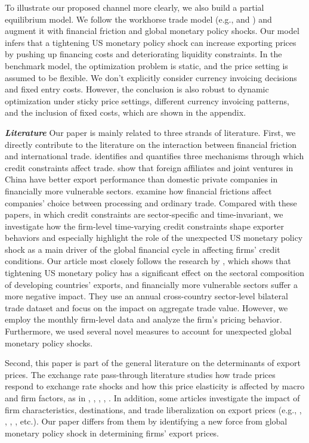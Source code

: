 To illustrate our proposed channel more clearly, we also build a partial equilibrium model. We follow the workhorse trade model (e.g., \cite{melitz2003impact} and \cite{manova2013credit}) and augment it with financial friction and global monetary policy shocks. Our model infers that a tightening US monetary policy shock can increase exporting prices by pushing up financing costs and deteriorating liquidity constraints. In the benchmark model, the optimization problem is static, and the price setting is assumed to be flexible. We don't explicitly consider currency invoicing decisions and fixed entry costs. However, the conclusion is also robust to dynamic optimization under sticky price settings, different currency invoicing patterns, and the inclusion of fixed costs, which are shown in the appendix.

\textbf{\textit{Literature}}
Our paper is mainly related to three strands of literature. First, we directly contribute to the literature on the interaction between financial friction and international trade. \cite{manova2013credit} identifies and quantifies three mechanisms through which credit constraints affect trade. \cite{manova2015firm} show that foreign affiliates and joint ventures in China have better export performance than domestic private companies in financially more vulnerable sectors. \cite{manova2016firms} examine how financial frictions affect companies' choice between processing and ordinary trade. Compared with these papers, in which credit constraints are sector-specific and time-invariant, we investigate how the firm-level time-varying credit constraints shape exporter behaviors and especially highlight the role of the unexpected US monetary policy shock as a main driver of the global financial cycle in affecting firms' credit conditions. Our article most closely follows the research by \cite{lin2018international}, which shows that tightening US monetary policy has a significant effect on the sectoral composition of developing countries' exports, and financially more vulnerable sectors suffer a more negative impact. They use an annual cross-country sector-level bilateral trade dataset and focus on the impact on aggregate trade value. However, we employ the monthly firm-level data and analyze the firm's pricing behavior. Furthermore, we used several novel measures to account for unexpected global monetary policy shocks. 

Second, this paper is part of the general literature on the determinants of export prices. The exchange rate pass-through literature studies how trade prices respond to exchange rate shocks and how this price elasticity is affected by macro and firm factors, as in \cite{obstfeld2000six}, \cite{amiti2014importers}, \cite{li2015exchange}, \cite{devereux2017importers}, \cite{auer2018quality}. In addition, some articles investigate the impact of firm characteristics, destinations, and trade liberalization on export prices (e.g., \cite{manova2012export}, \cite{fan2015credit}, \cite{harrigan2015export}, \cite{fan2015trade}, etc.). Our paper differs from them by identifying a new force from global monetary policy shock in determining firms' export prices.

